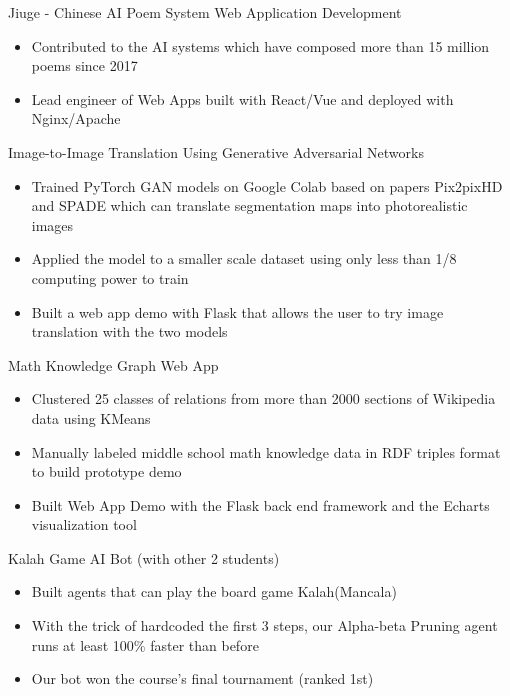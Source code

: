 \documentclass{resume}
\begin{document}
Jiuge - Chinese AI Poem System Web Application Development
\begin{itemize}
    \item Contributed to the AI systems which have composed more than 15 million poems since 2017
    \item Lead engineer of Web Apps built with React/Vue and deployed with Nginx/Apache
\end{itemize}


Image-to-Image Translation Using Generative Adversarial Networks
\begin{itemize}
    \item Trained PyTorch GAN models on Google Colab based on papers Pix2pixHD and SPADE which can translate segmentation maps into photorealistic images 
    \item Applied the model to a smaller scale dataset using only less than 1/8 computing power to train
    \item Built a web app demo with Flask that allows the user to try image translation with the two models
\end{itemize}


Math Knowledge Graph Web App
\begin{itemize}
    \item Clustered 25 classes of relations from more than 2000 sections of Wikipedia data using KMeans
    \item Manually labeled middle school math knowledge data in RDF triples format to build prototype demo
    \item Built Web App Demo with the Flask back end framework and the Echarts visualization tool
\end{itemize}


Kalah Game AI Bot (with other 2 students)
\begin{itemize}
    \item Built agents that can play the board game Kalah(Mancala)
    \item With the trick of hardcoded the first 3 steps, our Alpha-beta Pruning agent runs at least 100\% faster than before
    \item Our bot won the course's final tournament (ranked 1st)
\end{itemize}
\end{document}
